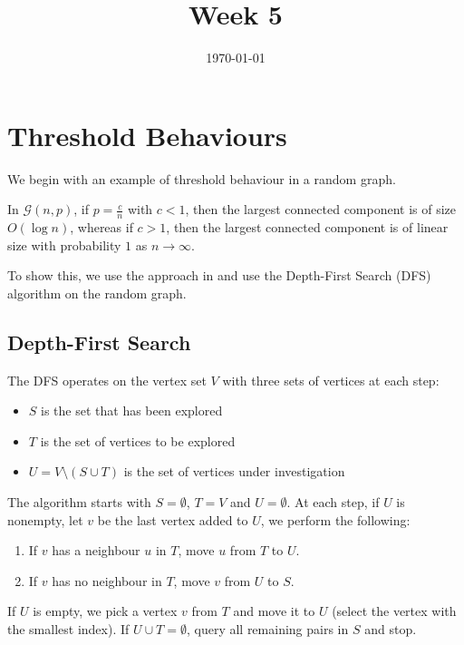 \documentclass{article}
\title{Week 5}
\date{\today}
\begin{document}
\maketitle

\section{Threshold Behaviours} 

We begin with an example of threshold behaviour in a random graph.  

\begin{example}
    In $\mathcal{G}(n,p)$, if $p=\frac{c}{n}$ with $c<1$, then the largest connected component is of size $O(\log n)$, whereas if $c>1$, then the largest connected component is of linear size with probability $1$ as $n\to \infty$.      
\end{example}

To show this, we use the approach in \citep{krivelevich2012phase} and use the Depth-First Search (DFS) algorithm on the random graph. 

\subsection{Depth-First Search}
The DFS operates on the vertex set $V$ with three sets of vertices at each step:
\begin{itemize}
    \item $S$ is the set that has been explored
    \item $T$ is the set of vertices to be explored
    \item $U = V\setminus (S\cup T)$ is the set of vertices under investigation
\end{itemize}

The algorithm starts with $S=\emptyset$, $T=V$ and $U=\emptyset$. At each step, if $U$ is nonempty, let $v$ be the last vertex added to $U$, we perform the following:
\begin{enumerate}
    \item If $v$ has a neighbour $u$ in $T$, move $u$ from $T$ to $U$.
    \item If $v$ has no neighbour in $T$, move $v$ from $U$ to $S$.
\end{enumerate}

If $U$ is empty, we pick a vertex $v$ from $T$ and move it to $U$ (select the vertex with the smallest index). If $U\cup T=\emptyset$, query all remaining pairs in $S$ and stop.  
\end{document}
